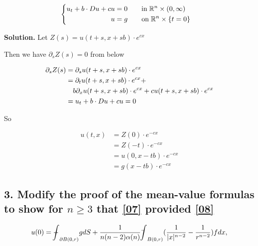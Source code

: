 \documentclass[a4paper]{book}
\newenvironment{solution}%
{\noindent\textbf{Solution.}}%
{\qedhere}
\newcommand\tbint{{\mathchar '26\mkern -14mu\int}}
\newcommand\dbbint{{-\mkern -19mu\int}}
\numberwithin{equation}{chapter}
\theoremstyle{definition}
\begin{document}
\begin{multicols}{2}
\begin{equation}\label{04}
	\begin{cases}
	\begin{aligned}
	u_t + b \cdot \mathnormal{D}u + cu &= 0 \qquad \text{in} \; \mathbb{R}^n \times (0,\infty)\\
		u &= g \qquad \text{on} \; \mathbb{R}^n \times \{ t = 0 \} 
		\end{aligned}
	\end{cases}
\end{equation}

\begin{solution}
	Let $Z(s) = u(t + s, x + sb) \cdot e^{cx}$
	
	Then we have $\partial_sZ(s) = 0$ from below
	
	
	\begin{equation}
	\begin{aligned}
		\partial_sZ(s) & = \partial_su(t + s, x + sb)\cdot e^{cx}    \\
		& = \partial_t u(t + s, x + sb)\cdot e^{cx} + \\
		& \quad b\partial_x u(t + s, x + sb)\cdot e^{cx} + cu(t + s, x + sb) \cdot e^{cx} \\
		& = u_t + b \cdot \mathnormal{D}u + cu = 0
		\end{aligned}
	\end{equation}
	
	So 
	
	\begin{equation}
		\begin{aligned}
		u(t, x) &= Z(0)\cdot e^{-cx} \\
		& = Z(-t)\cdot e^{-cx} \\
		& = u(0, x - tb)\cdot e^{-cx} \\
		& = g(x - tb) \cdot e^{-cx}
		\end{aligned}
	\end{equation}
\end{solution}
%


\subsection{3. Modify the proof of the mean-value formulas to show for $ n \geq 3$ that \ref{07} provided \ref{08} }

\small\begin{equation}\label{07}
	u(0) = \dbbint_{\partial \mathnormal{B}(0,r)} g d \mathnormal{S} + \frac{1}{n(n-2)\alpha(n)} \tbint_{\mathnormal{B}(0,r)}( \frac{1}{|x|^{n-2}} -
	 \frac{1}{r^{n-2}}) f dx, 
\end{equation}


\end{multicols}
\end{document}
